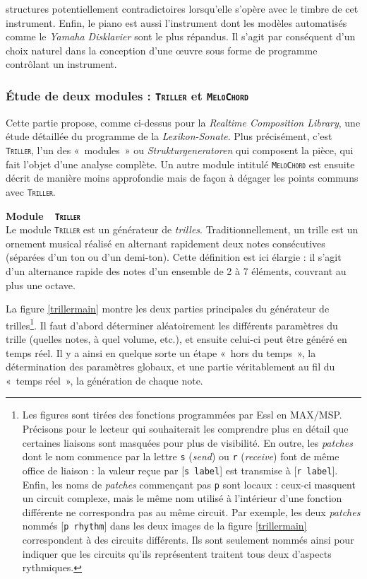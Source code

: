 \documentclass[a4paper,12pt]{article}
\newcommand{\guill}[1]{«~#1~»}
\newcommand{\module}[1]{\texttt{\textsc{#1}}}
\newcommand{\patch}[1]{[\texttt{#1}]}
\begin{document}
structures potentiellement contradictoires lorsqu'elle s'opère avec le timbre de cet instrument. Enfin, le piano est aussi l'instrument dont les modèles automatisés comme le \emph{Yamaha Disklavier} sont le plus répandus. Il s'agit par conséquent d'un choix naturel dans la conception d'une œuvre sous forme de programme contrôlant un instrument.

\subsubsection{Étude de deux modules : \textnormal{\module{Triller}} et \textnormal{\module{MeloChord}}}
\label{lsmodules}

Cette partie propose, comme ci-dessus pour la \emph{Realtime Composition Library}, une étude détaillée du programme de la \emph{Lexikon-Sonate}. Plus précisément, c'est \module{Triller}, l'un des \guill{modules} ou \emph{Strukturgeneratoren} qui composent la pièce, qui fait l'objet d'une analyse complète. Un autre module intitulé \module{MeloChord} est ensuite décrit de manière moins approfondie mais de façon à dégager les points communs avec \module{Triller}.

\textbf{Module~~\textnormal{\module{Triller}}} \\
Le module \module{Triller} est un générateur de \emph{trilles}. Traditionnellement, un trille est un ornement musical réalisé en alternant rapidement deux notes consécutives (séparées d'un ton ou d'un demi-ton). Cette définition est ici élargie : il s'agit d'un alternance rapide des notes d'un ensemble de 2 à 7 éléments, couvrant au plus une octave.

La figure \ref{trillermain} montre les deux parties principales du générateur de trilles\footnote{Les figures sont tirées des fonctions programmées par Essl en MAX/MSP. Précisons pour le lecteur qui souhaiterait les comprendre plus en détail que certaines liaisons sont masquées pour plus de visibilité. En outre, les \emph{patches} dont le nom commence par la lettre \texttt{s} (\emph{send}) ou \texttt{r} (\emph{receive}) font de même office de liaison : la valeur reçue par \patch{s label} est transmise à \patch{r label}. Enfin, les noms de \emph{patches} commençant pas \texttt{p} sont locaux : ceux-ci masquent un circuit complexe, mais le même nom utilisé à l'intérieur d'une fonction différente ne correspondra pas au même circuit. Par exemple, les deux \emph{patches} nommés \patch{p rhythm} dans les deux images de la figure \ref{trillermain} correspondent à des circuits différents. Ils sont seulement nommés ainsi pour indiquer que les circuits qu'ils représentent traitent tous deux d'aspects rythmiques.}. Il faut d'abord déterminer aléatoirement les différents paramètres du trille (quelles notes, à quel volume, etc.), et ensuite celui-ci peut être généré en temps réel. Il y a ainsi en quelque sorte un étape \guill{hors du temps}, la détermination des paramètres globaux, et une partie véritablement au fil du \guill{temps réel}, la génération de chaque note.
\end{document}
